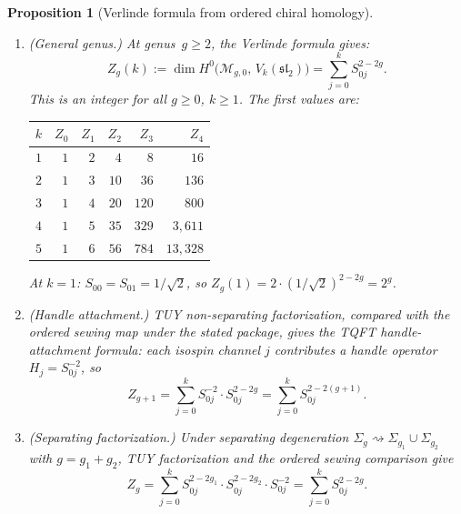 \documentclass[11pt,reqno]{amsart}
\newtheorem{proposition}[theorem]{Proposition}
\theoremstyle{definition}
\theoremstyle{remark}
\newcommand{\cM}{\mathcal{M}}
\numberwithin{equation}{section}
\begin{document}
\begin{proposition}[Verlinde formula from ordered chiral
homology]
\begin{enumerate}[label=\textup{(\roman*)}]
\item \textup{(General genus.)}
  At genus~$g \geq 2$, the Verlinde formula gives:
  \begin{equation}\label{eq:verlinde-general}
    Z_g(k) := \dim H^0\!\bigl(\cM_{g,0},\,
    V_k(\mathfrak{sl}_2)\bigr)
    = \sum_{j=0}^{k} S_{0j}^{2-2g}.
  \end{equation}
  This is an integer for all $g \geq 0$, $k \geq 1$.
  The first values are:
  \begin{center}
  \renewcommand{\arraystretch}{1.3}
  \begin{tabular}{@{} c r r r r r @{}}
  \toprule
  $k$ & $Z_0$ & $Z_1$ & $Z_2$ & $Z_3$ & $Z_4$ \\
  \midrule
  $1$ & $1$ & $2$ & $4$ & $8$ & $16$ \\
  $2$ & $1$ & $3$ & $10$ & $36$ & $136$ \\
  $3$ & $1$ & $4$ & $20$ & $120$ & $800$ \\
  $4$ & $1$ & $5$ & $35$ & $329$ & $3{,}611$ \\
  $5$ & $1$ & $6$ & $56$ & $784$ & $13{,}328$ \\
  \bottomrule
  \end{tabular}
  \end{center}
  At $k = 1$: $S_{00} = S_{01} = 1/\sqrt{2}$, so
  $Z_g(1) = 2 \cdot (1/\sqrt{2})^{2-2g} = 2^g$.

\item \textup{(Handle attachment.)}
  TUY non-separating factorization, compared with the ordered
  sewing map under the stated package, gives the TQFT
  handle-attachment formula:
  each isospin channel $j$ contributes a handle operator
  $H_j = S_{0j}^{-2}$, so
  \begin{equation}\label{eq:handle-attachment}
    Z_{g+1}
    = \sum_{j=0}^{k} S_{0j}^{-2} \cdot S_{0j}^{2-2g}
    = \sum_{j=0}^{k} S_{0j}^{2-2(g+1)}.
  \end{equation}

\item \textup{(Separating factorization.)}
  Under separating degeneration $\Sigma_g \rightsquigarrow
  \Sigma_{g_1} \cup \Sigma_{g_2}$ with $g = g_1 + g_2$,
  TUY factorization and the ordered sewing comparison give
  \begin{equation}\label{eq:sep-factorization}
    Z_g
    = \sum_{j=0}^{k} S_{0j}^{2-2g_1} \cdot S_{0j}^{2-2g_2}
    \cdot S_{0j}^{-2}
    = \sum_{j=0}^{k} S_{0j}^{2-2g}.
  \end{equation}
\end{enumerate}
\end{proposition}
\end{document}
